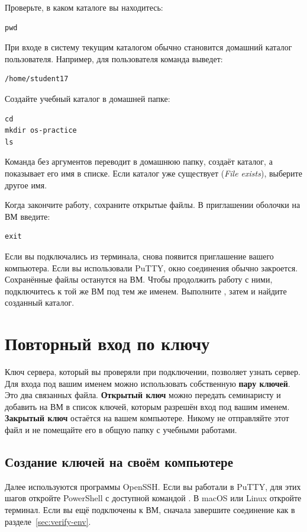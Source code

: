Проверьте, в каком каталоге вы находитесь:
\begin{verbatim}
pwd
\end{verbatim}
При входе в систему текущим каталогом обычно становится домашний каталог
пользователя. Например, для пользователя  команда выведет:
\begin{verbatim}
/home/student17
\end{verbatim}

Создайте учебный каталог в домашней папке:
\begin{verbatim}
cd
mkdir os-practice
ls
\end{verbatim}
Команда  без аргументов переводит в домашнюю папку,
 создаёт каталог, а  показывает его имя в списке.
Если каталог уже существует (\emph{File exists}), выберите другое имя.

Когда закончите работу, сохраните открытые файлы. В приглашении
оболочки на ВМ введите:
\begin{verbatim}
exit
\end{verbatim}
Если вы подключались из терминала, снова появится приглашение вашего
компьютера. Если вы использовали PuTTY, окно соединения обычно
закроется. Сохранённые файлы останутся на ВМ. Чтобы продолжить работу
с ними, подключитесь к той же ВМ под тем же именем.
Выполните , затем  и найдите созданный каталог.

\section{Повторный вход по ключу}
\label{sec:ssh-keys}

Ключ сервера, который вы проверяли при подключении, позволяет узнать
сервер. Для входа под вашим именем можно использовать собственную
\textbf{пару ключей}. Это два связанных файла. \textbf{Открытый ключ}
можно передать семинаристу и добавить на ВМ в список ключей, которым
разрешён вход под вашим именем. \textbf{Закрытый ключ} остаётся на вашем
компьютере. Никому не отправляйте этот файл и не помещайте его в общую
папку с учебными работами.

\subsection{Создание ключей на своём компьютере}

Далее используются программы OpenSSH. Если вы работали в PuTTY,
для этих шагов откройте PowerShell с доступной командой .
В macOS или Linux откройте терминал. Если вы ещё подключены к ВМ,
сначала завершите соединение как в разделе~\ref{sec:verify-env}.


